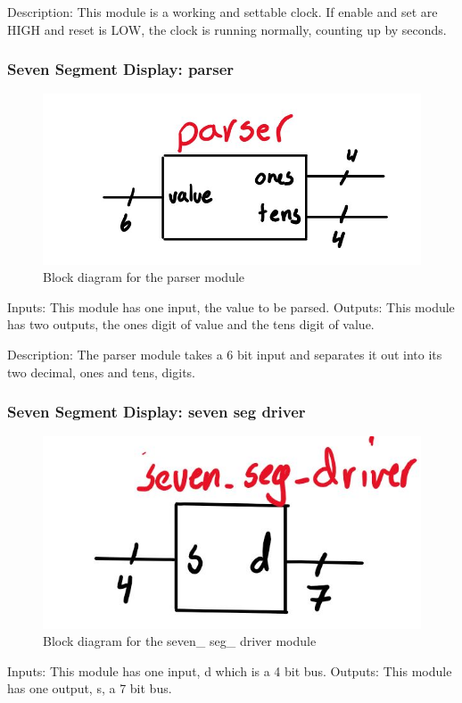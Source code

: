 \documentclass[a4paper]{article}
\begin{document}
Description: This module is a working and settable clock. If enable and set are HIGH and reset is LOW, the clock is running normally, counting up by seconds.

\subsubsection{Seven Segment Display: parser}
\begin{figure}[H]
    \includegraphics[width=0.8 \linewidth]{images/parser.JPG}
    \caption{Block diagram for the parser module}
    \label{parser}
\end{figure}

Inputs: This module has one input, the value to be parsed.
Outputs: This module has two outputs, the ones digit of value and the tens digit of value.

Description: The parser module takes a 6 bit input and separates it out into its two decimal, ones and tens, digits.

\subsubsection{Seven Segment Display: seven seg driver}
\begin{figure}[H]
    \includegraphics[width=0.8 \linewidth]{images/sevensegdriver.JPG}
    \caption{Block diagram for the seven\_ seg\_ driver module}
    \label{sevensegdriver}
\end{figure}

Inputs: This module has one input, d which is a 4 bit bus.
Outputs: This module has one output, s, a 7 bit bus.
\end{document}
